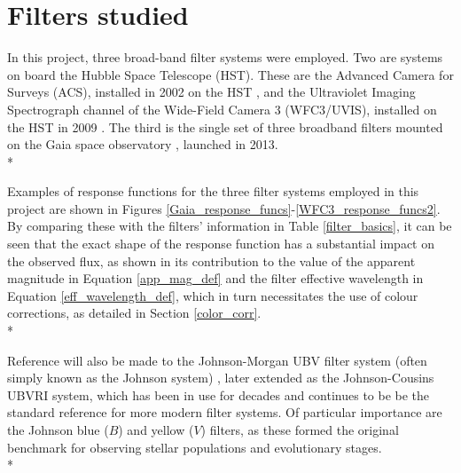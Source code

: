 \documentclass[12pt, a4paper]{report}
\begin{document}
\section{Filters studied} \label{filter_desc}
In this project, three broad-band filter systems were employed. Two are systems on board the Hubble Space Telescope (HST). These are the Advanced Camera for Surveys (ACS), installed in 2002 on the HST \citep{2007AJ....133.1658S}, and the Ultraviolet Imaging Spectrograph channel of the Wide-Field Camera 3 (WFC3/UVIS), installed on the HST in 2009 \citep{2010wfc..rept...14K,2010SPIE.7731E..0ZM}. The third is the single set of three broadband filters mounted on the Gaia space observatory \citep{2010A&A...523A..48J}, launched in 2013. \\*

Examples of response functions for the three filter systems employed in this project are shown in Figures \ref{Gaia_response_funcs}-\ref{WFC3_response_funcs2}. By comparing these with the filters' information in Table \ref{filter_basics}, it can be seen that the exact shape of the response function has a substantial impact on the observed flux, as shown in its contribution to the value of the apparent magnitude in Equation \ref{app_mag_def} and the filter effective wavelength in Equation \ref{eff_wavelength_def}, which in turn necessitates the use of colour corrections, as detailed in Section \ref{color_corr}.\\*

Reference will also be made to the Johnson-Morgan UBV filter system (often simply known as the Johnson system) \citep{1953ApJ...117..313J}, later extended as the Johnson-Cousins UBVRI \citep{1990PASP..102.1181B} system, which has been in use for decades and continues to be be the standard reference for more modern filter systems. Of particular importance are the Johnson blue ($B$) and yellow ($V$) filters, as these formed the original benchmark for observing stellar populations and evolutionary stages. \\*
\end{document}
